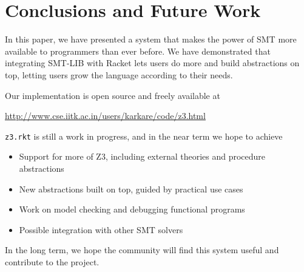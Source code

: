 \section{Conclusions and Future Work}

In this paper, we have presented a system that makes the power of SMT more
available to programmers than ever before. We have demonstrated that integrating
SMT-LIB with Racket lets users do more and build abstractions on top, letting
users grow the language according to their needs.

Our implementation is open source and freely available at
\begin{center}
\url{http://www.cse.iitk.ac.in/users/karkare/code/z3.html}
\end{center}

\texttt{z3.rkt} is still a work in progress, and in the near term we hope to
achieve

\begin{itemize}
\item Support for more of Z3, including external theories and procedure
  abstractions
\item New abstractions built on top, guided by practical use cases
\item Work on model checking and debugging functional programs
\item Possible integration with other SMT solvers
\end{itemize}

In the long term, we hope the community will find this system useful and
contribute to the project.
